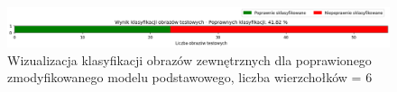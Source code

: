 \begin{figure}[ht]
	\centering
	\includegraphics[width=14cm]{resources/tests/images/v4/base6_1_1_bar.png}
	\caption{Wizualizacja klasyfikacji obrazów zewnętrznych dla poprawionego zmodyfikowanego modelu podstawowego, liczba wierzchołków = 6}
	\label{Fig:tests-base-6c}
\end{figure}
\FloatBarrier

